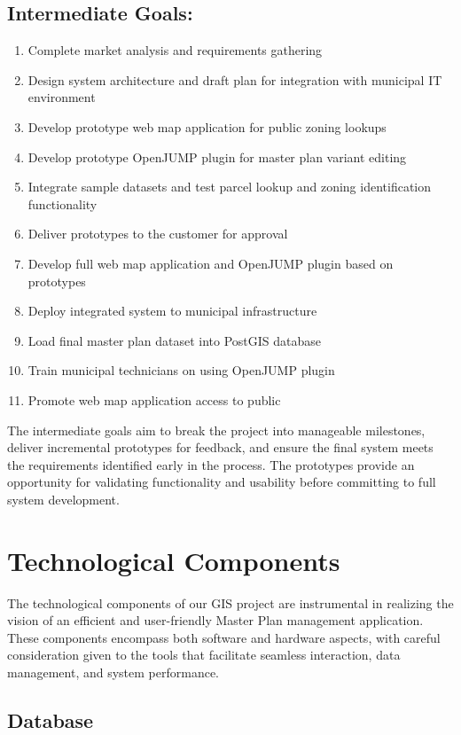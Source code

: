 \subsection{Intermediate Goals:}
\begin{enumerate}
    \item Complete market analysis and requirements gathering
    \item Design system architecture and draft plan for integration with municipal IT environment
    \item Develop prototype web map application for public zoning lookups
    \item Develop prototype OpenJUMP plugin for master plan variant editing
    \item Integrate sample datasets and test parcel lookup and zoning identification functionality
    \item Deliver prototypes to the customer for approval
    \item Develop full web map application and OpenJUMP plugin based on prototypes
    \item Deploy integrated system to municipal infrastructure
    \item Load final master plan dataset into PostGIS database
    \item Train municipal technicians on using OpenJUMP plugin
    \item Promote web map application access to public
\end{enumerate}


The intermediate goals aim to break the project into manageable milestones, deliver incremental prototypes for feedback, and ensure the final system meets the requirements identified early in the process. The prototypes provide an opportunity for validating functionality and usability before committing to full system development.


\section{Technological Components}
The technological components of our GIS project are instrumental in realizing the vision of an efficient and user-friendly Master Plan management application. These components encompass both software and hardware aspects, with careful consideration given to the tools that facilitate seamless interaction, data management, and system performance.

\subsection{Database}

